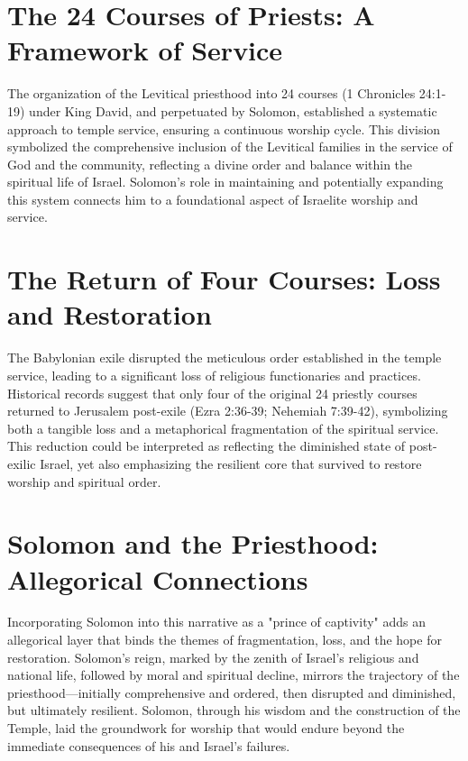 \section{The 24 Courses of Priests: A Framework of Service}

The organization of the Levitical priesthood into 24 courses (1 Chronicles 24:1-19) under King David, and perpetuated by Solomon, established a systematic approach to temple service, ensuring a continuous worship cycle. This division symbolized the comprehensive inclusion of the Levitical families in the service of God and the community, reflecting a divine order and balance within the spiritual life of Israel. Solomon's role in maintaining and potentially expanding this system connects him to a foundational aspect of Israelite worship and service.

\section{The Return of Four Courses: Loss and Restoration}

The Babylonian exile disrupted the meticulous order established in the temple service, leading to a significant loss of religious functionaries and practices. Historical records suggest that only four of the original 24 priestly courses returned to Jerusalem post-exile (Ezra 2:36-39; Nehemiah 7:39-42), symbolizing both a tangible loss and a metaphorical fragmentation of the spiritual service. This reduction could be interpreted as reflecting the diminished state of post-exilic Israel, yet also emphasizing the resilient core that survived to restore worship and spiritual order.

\section{Solomon and the Priesthood: Allegorical Connections}

Incorporating Solomon into this narrative as a "prince of captivity" adds an allegorical layer that binds the themes of fragmentation, loss, and the hope for restoration. Solomon's reign, marked by the zenith of Israel's religious and national life, followed by moral and spiritual decline, mirrors the trajectory of the priesthood—initially comprehensive and ordered, then disrupted and diminished, but ultimately resilient. Solomon, through his wisdom and the construction of the Temple, laid the groundwork for worship that would endure beyond the immediate consequences of his and Israel's failures.

